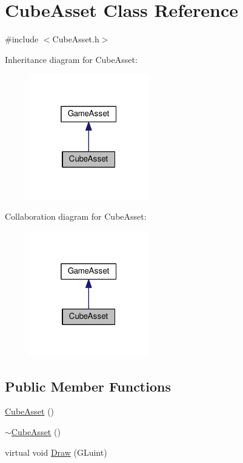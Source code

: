 \hypertarget{class_cube_asset}{}\section{Cube\+Asset Class Reference}
\label{class_cube_asset}


{\ttfamily \#include $<$Cube\+Asset.\+h$>$}



Inheritance diagram for Cube\+Asset\+:
\nopagebreak
\begin{figure}[H]
\begin{center}
\leavevmode
\includegraphics[width=148pt]{class_cube_asset__inherit__graph}
\end{center}
\end{figure}


Collaboration diagram for Cube\+Asset\+:
\nopagebreak
\begin{figure}[H]
\begin{center}
\leavevmode
\includegraphics[width=148pt]{class_cube_asset__coll__graph}
\end{center}
\end{figure}
\subsection*{Public Member Functions}
\begin{DoxyCompactItemize}
\item 
\hyperlink{class_cube_asset_a2f46c2bbb2453371b7ed97b50125aaf3}{Cube\+Asset} ()
\item 
\hyperlink{class_cube_asset_ab3ab9a5da82cbf8537a28652410093b1}{$\sim$\+Cube\+Asset} ()
\item 
virtual void \hyperlink{class_cube_asset_a1af568486056e254ffcf98fd99947bfe}{Draw} (G\+Luint)
\end{DoxyCompactItemize}


